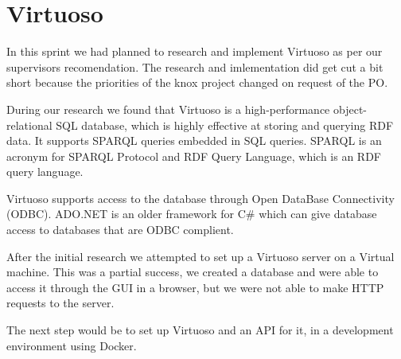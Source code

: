 \section{Virtuoso}
In this sprint we had planned to research and implement Virtuoso as per our supervisors recomendation.
The research and imlementation did get cut a bit short because the priorities of the knox project changed on request of the PO.

During our research we found that Virtuoso is a high-performance object-relational SQL database, which is highly effective at storing and querying RDF data. It supports SPARQL queries embedded in SQL queries. SPARQL is an acronym for SPARQL Protocol and RDF Query Language, which is an RDF query language.


Virtuoso supports access to the database through Open DataBase Connectivity (ODBC).
ADO.NET is an older framework for C\# which can give database access to databases that are ODBC complient.


After the initial research we attempted to set up a Virtuoso server on a Virtual machine. This was a partial success, we created a database and were able to access it through the GUI in a browser, but we were not able to make HTTP requests to the server.

The next step would be to set up Virtuoso and an API for it, in a development environment using Docker.